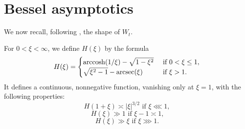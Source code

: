 \documentclass[reqno]{amsart} 
\begin{document}
\section{Bessel asymptotics}
We now recall, following \cite[p 1527-1528]{MR3102912}, the shape of $W_t$.


For $0 < \xi < \infty$, we define $H(\xi)$ by the formula
\begin{equation*}
  H(\xi) =
  \begin{cases}
    {\operatorname{arccosh}} {\left(1/ \xi\right)}   - \sqrt{1 - \xi ^2 }  &  \text{ if } 0 < \xi \leq 1, \\
    \sqrt{\xi ^2 - 1} - {\operatorname{arcsec}} {\left(\xi\right)}                                               & \text{ if } \xi > 1.
  \end{cases}
\end{equation*}
It defines a continuous, nonnegative function, vanishing only at $\xi = 1$, with the following properties:
\begin{equation}\label{equation:H-near-critical}
  \text{$H(1 + \xi) \asymp |\xi|^{3/2}$ if $\xi \lll 1$},
\end{equation}
\begin{equation}\label{equation:H-in-bulk}
  \text{$H(\xi) \gg 1$ if $\xi - 1 \asymp 1$,}
\end{equation}
\begin{equation}\label{eqn:growth-of-H-at-infinity}
  \text{$H(\xi) \gg \xi$ if $\xi \ggg 1$.}
\end{equation}
\end{document}
